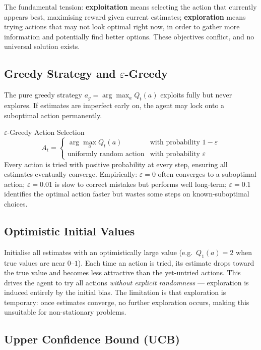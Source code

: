 \documentclass[11pt,a4paper]{article}
\begin{document}
The fundamental tension: \textbf{exploitation} means selecting the action that currently appears best, maximising reward given current estimates; \textbf{exploration} means trying actions that may not look optimal right now, in order to gather more information and potentially find better options. These objectives conflict, and no universal solution exists.

\subsection{Greedy Strategy and $\varepsilon$-Greedy}

The pure greedy strategy $a_g = \arg\max_a Q_t(a)$ exploits fully but never explores. If estimates are imperfect early on, the agent may lock onto a suboptimal action permanently.

\begin{defbox}{$\varepsilon$-Greedy Action Selection}
\[
A_t = \begin{cases}
\arg\max_a Q_t(a) & \text{with probability } 1-\varepsilon \\
\text{uniformly random action} & \text{with probability } \varepsilon
\end{cases}
\]
Every action is tried with positive probability at every step, ensuring all estimates eventually converge. Empirically: $\varepsilon=0$ often converges to a suboptimal action; $\varepsilon=0.01$ is slow to correct mistakes but performs well long-term; $\varepsilon=0.1$ identifies the optimal action faster but wastes some steps on known-suboptimal choices.
\end{defbox}

\subsection{Optimistic Initial Values}

Initialise all estimates with an optimistically large value (e.g.\ $Q_1(a) = 2$ when true values are near $0$--$1$). Each time an action is tried, its estimate drops toward the true value and becomes less attractive than the yet-untried actions. This drives the agent to try all actions \emph{without explicit randomness} --- exploration is induced entirely by the initial bias. The limitation is that exploration is temporary: once estimates converge, no further exploration occurs, making this unsuitable for non-stationary problems.

\subsection{Upper Confidence Bound (UCB)}
\end{document}
